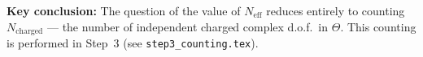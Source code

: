 \documentclass[11pt,a4paper]{article}
\theoremstyle{remark}
\begin{document}
\medskip\noindent
\textbf{Key conclusion:} The question of the value of $N_{\mathrm{eff}}$ reduces entirely to
counting $N_{\mathrm{charged}}$ — the number of independent charged complex d.o.f.\ in $\Theta$.
This counting is performed in Step~3 (see \texttt{step3\_counting.tex}).

\ifdefined\INCLUDEMODE\else
\end{document}
